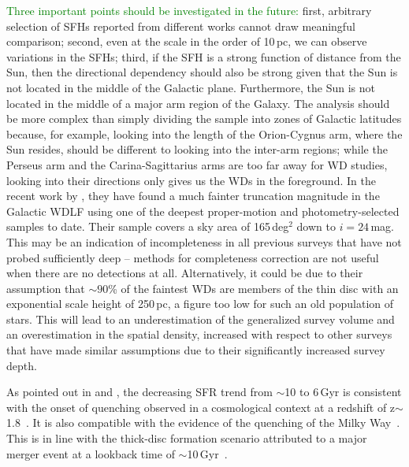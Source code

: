 \documentclass[fleqn,usenatbib]{mnras}
\begin{document}
\textcolor{green}{Three important points should be investigated in the future:}
first, arbitrary selection of SFHs reported from different works cannot draw
meaningful comparison; second, even at the scale in the order of 10\,pc, we
can observe variations in the SFHs; third, if the SFH is a strong function of
distance from the Sun, then the directional dependency should also be strong
given that the Sun is not located in the middle of the Galactic plane.
Furthermore, the Sun is not located in the middle of a major arm region of the
Galaxy. The analysis should be more complex than simply dividing the sample into
zones of Galactic latitudes because, for example, looking into the length of the
Orion-Cygnus arm, where the Sun resides, should be different to looking into the
inter-arm regions; while the Perseus arm and the Carina-Sagittarius arms are too far
away for WD studies, looking into their directions only gives us the WDs in the
foreground. In the recent work by \citet{2024MNRAS.535.3611Q}, they have
found a much fainter truncation magnitude in the Galactic WDLF using one of the
deepest proper-motion and photometry-selected samples to date. Their sample
covers a sky area of 165\,deg$^2$ down to $i=24$\,mag. This may be an indication
of incompleteness in all previous surveys that have not probed sufficiently
deep -- methods for completeness correction are not useful when there are
no detections at all. Alternatively, it could be due to their assumption that $\sim90$\% of the faintest WDs are members of the thin disc with an exponential scale height of 250\,pc, a figure too low for such an old population of stars. This will lead to an underestimation of the generalized survey volume and an overestimation in the spatial density, increased with respect to other surveys that have made similar assumptions due to their significantly increased survey depth.

As pointed out in \citet{2019A&A...624L...1M} and \citet{2019ApJ...878L..11I},
the decreasing SFR trend from $\sim$10 to 6\,Gyr is consistent with the
onset of quenching observed in a cosmological context at a redshift of
z$\sim$1.8~\citep[corresponds to a lookback time of
$\sim$10\,Gyr, e.g.][]{2016MNRAS.461.1100R, 2017MNRAS.471.4155K}. It is
also compatible with the evidence of the quenching of the Milky
Way~\citep{2016A&A...589A..66H}. This is in line with the thick-disc formation
scenario attributed to a major merger event at a lookback time of 
$\sim$10\,Gyr~\citep{2018Natur.563...85H}.
\end{document}

